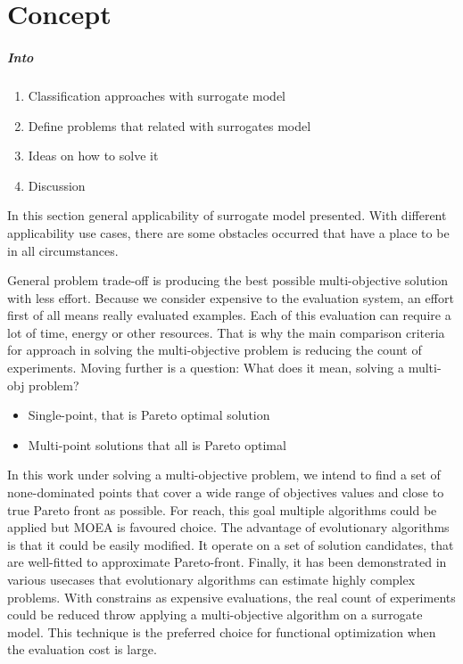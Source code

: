 \chapter{Concept}

    \paragraph{Into}
    \begin{enumerate}
        \item Classification approaches with surrogate model
        \item Define problems that related with surrogates model
        \item Ideas on how to solve it
        \item Discussion
    \end{enumerate}

    In this section general applicability of surrogate model presented. With different applicability use cases, there are some obstacles occurred that have a place to be in all circumstances.

    General problem trade-off is producing the best possible multi-objective solution with less effort. Because we consider expensive to the evaluation system, an effort first of all means really evaluated examples. Each of this evaluation can require a lot of time, energy or other resources. That is why the main comparison criteria for approach in solving the multi-objective problem is reducing the count of experiments. Moving further is a question: What does it mean, solving a multi-obj problem?
    \begin{itemize}
        \item Single-point, that is Pareto optimal solution
        \item Multi-point solutions that all is Pareto optimal
    \end{itemize}

    In this work under solving a multi-objective problem, we intend to find a set of none-dominated points that cover a wide range of objectives values and close to true Pareto front as possible. For reach, this goal multiple algorithms could be applied but MOEA is favoured choice. The advantage of evolutionary algorithms is that it could be easily modified. It operate on a set of solution candidates, that are well-fitted to approximate Pareto-front. Finally, it has been demonstrated in various usecases that evolutionary algorithms can estimate highly complex problems. With constrains as expensive evaluations, the real count of experiments could be reduced throw applying a multi-objective algorithm on a surrogate model. This technique is the preferred choice for functional optimization when the evaluation cost is large.

